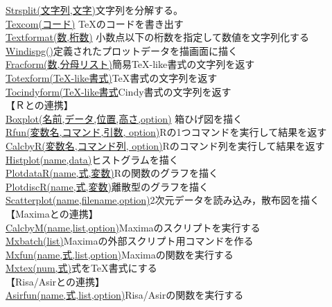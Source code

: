 \documentclass[papersize,a4paper,12pt,uplatex]{jsarticle}
\begin{document}
\begin{tabbing}
\hyperlink{strsplit}{Strsplit(文字列,文字)}\>文字列を分解する。\\
\hyperlink{texcom}{Texcom(コード)} \>\TeX のコードを書き出す\\
\hyperlink{textformat}{Textformat(数,桁数)} \>小数点以下の桁数を指定して数値を文字列化する\\
\hyperlink{windispg}{Windispg()}\>定義されたプロットデータを描画面に描く\\
\hyperlink{fracform}{Fracform(数,分母リスト)}\>簡易TeX-like書式の文字列を返す\\
\hyperlink{totexform}{Totexform(TeX-like書式)}\>TeX書式の文字列を返す\\
\hyperlink{tocindyform}{Tocindyform(TeX-like書式}\>Cindy書式の文字列を返す\\
\vspace{\baselineskip}
【Ｒとの連携】\\
\hyperlink{boxplot}{Boxplot(名前,データ,位置,高さ,option)} \>箱ひげ図を描く\\
\hyperlink{rfun}{Rfun(変数名,コマンド,引数, option)}\>Rの1つコマンドを実行して結果を返す\\
\hyperlink{calcbyr}{CalcbyR(変数名,コマンド列, option)}\>Rのコマンド列を実行して結果を返す\\
\hyperlink{histplot}{Histplot(name,data)}\>ヒストグラムを描く\\
\hyperlink{plotdatar}{PlotdataR(name,式,変数)}\>Rの関数のグラフを描く\\
\hyperlink{plotdiscr}{PlotdiscR(name,式,変数)}\>離散型のグラフを描く\\
\hyperlink{scatterplot}{Scatterplot(name,filename,option)}\>2次元データを読み込み，散布図を描く\\
\vspace{\baselineskip}
【Maximaとの連携】\\
\hyperlink{calcbyM}{CalcbyM(name,list,option)}\>Maximaのスクリプトを実行する\\
\hyperlink{mxbatch}{Mxbatch(list)}\>Maximaの外部スクリプト用コマンドを作る\\
\hyperlink{mxfun}{Mxfun(name,式,list,option)}\>Maximaの関数を実行する\\
\hyperlink{mxtex}{Mxtex(num,式)}\>式をTeX書式にする\\
\vspace{\baselineskip}
【Risa/Asirとの連携】\\
\hyperlink{asirfun}{Asirfun(name,式,list,option)}\>Risa/Asirの関数を実行する\\

\end{tabbing}
\end{document}
